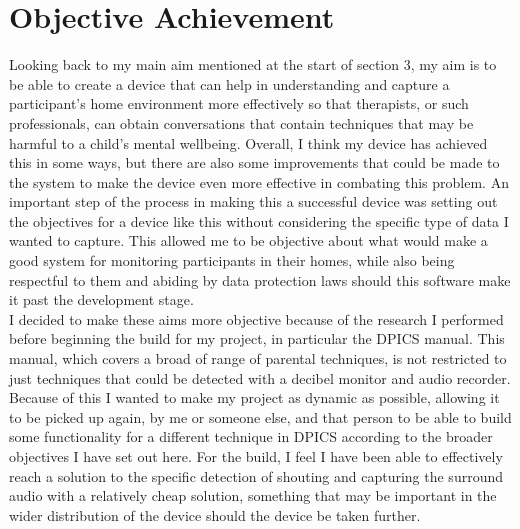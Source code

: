 \documentclass[a4paper,11pt]{report}
\begin{document}
\section{Objective Achievement}
Looking back to my main aim mentioned at the start of section 3, my aim is to be able to create a device that can help in understanding and capture a participant’s home environment more effectively so that therapists, or such professionals, can obtain conversations that contain techniques that may be harmful to a child’s mental wellbeing. Overall, I think my device has achieved this in some ways, but there are also some improvements that could be made to the system to make the device even more effective in combating this problem. An important step of the process in making this a successful device was setting out the objectives for a device like this without considering the specific type of data I wanted to capture. This allowed me to be objective about what would make a good system for monitoring participants in their homes, while also being respectful to them and abiding by data protection laws should this software make it past the development stage.\\
 
I decided to make these aims more objective because of the research I performed before beginning the build for my project, in particular the DPICS manual. This manual, which covers a broad of range of parental techniques, is not restricted to just techniques that could be detected with a decibel monitor and audio recorder. Because of this I wanted to make my project as dynamic as possible, allowing it to be picked up again, by me or someone else, and that person to be able to build some functionality for a different technique in DPICS according to the broader objectives I have set out here. For the build, I feel I have been able to effectively reach a solution to the specific detection of shouting and capturing the surround audio with a relatively cheap solution, something that may be important in the wider distribution of the device should the device be taken further.\\
\end{document}
